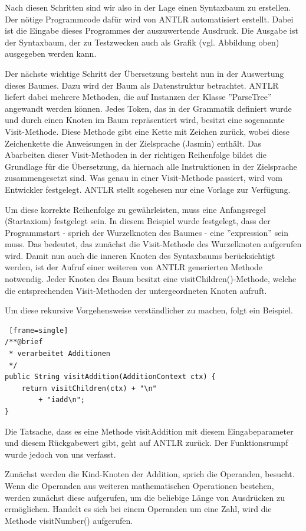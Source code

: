 Nach diesen Schritten sind wir also in der Lage einen Syntaxbaum zu erstellen. Der nötige Programmcode dafür wird von ANTLR automatisiert erstellt. Dabei ist die Eingabe dieses Programmes der auszuwertende Ausdruck. Die Ausgabe ist der Syntaxbaum, der zu Testzwecken auch als Grafik (vgl. Abbildung oben) ausgegeben werden kann. 

\pagebreak

Der nächste wichtige Schritt der Übersetzung besteht nun in der Auswertung dieses Baumes. Dazu wird der Baum als Datenstruktur betrachtet. ANTLR liefert dabei mehrere Methoden, die auf Instanzen der Klasse ''ParseTree'' angewandt werden können. 
Jedes Token, das in der Grammatik definiert wurde und durch einen Knoten im Baum repräsentiert wird, besitzt eine sogenannte Visit-Methode. Diese Methode gibt eine Kette mit Zeichen zurück, wobei diese Zeichenkette die Anweisungen in der Zielsprache (Jasmin) enthält. Das Abarbeiten dieser Visit-Methoden in der richtigen Reihenfolge bildet die Grundlage für die Übersetzung, da hiernach alle Instruktionen in der Zielsprache zusammengesetzt sind. Was genau in einer Visit-Methode passiert, wird vom Entwickler festgelegt. ANTLR stellt sogehesen nur eine Vorlage zur Verfügung.

Um diese korrekte Reihenfolge zu gewährleisten, muss eine Anfangsregel (Startaxiom) festgelegt sein. In diesem Beispiel wurde festgelegt, dass der Programmstart - sprich der Wurzelknoten des Baumes - eine ''expression'' sein muss. Das bedeutet, das zunächst die Visit-Methode des Wurzelknoten aufgerufen wird. Damit nun auch die inneren Knoten des Syntaxbaums berücksichtigt werden, ist der Aufruf einer weiteren von ANTLR generierten Methode notwendig. Jeder Knoten des Baum besitzt eine visitChildren()-Methode, welche die entsprechenden Visit-Methoden der untergeordneten Knoten aufruft.

\pagebreak

Um diese rekursive Vorgehensweise verständlicher zu machen, folgt ein Beispiel.


\begin{lstlisting} [frame=single]
/**@brief
 * verarbeitet Additionen
 */
public String visitAddition(AdditionContext ctx) {
	return visitChildren(ctx) + "\n"
		+ "iadd\n";
}
\end{lstlisting}
Die Tatsache, dass es eine Methode visitAddition mit diesem Eingabeparameter und diesem Rückgabewert gibt, geht auf ANTLR zurück. Der Funktionsrumpf wurde jedoch von uns verfasst.

Zunächst werden die Kind-Knoten der Addition, sprich die Operanden, besucht. Wenn die Operanden aus weiteren mathematischen Operationen bestehen, werden zunächst diese aufgerufen, um die beliebige Länge von Ausdrücken zu ermöglichen. Handelt es sich bei einem Operanden um eine Zahl, wird die Methode visitNumber() aufgerufen.


